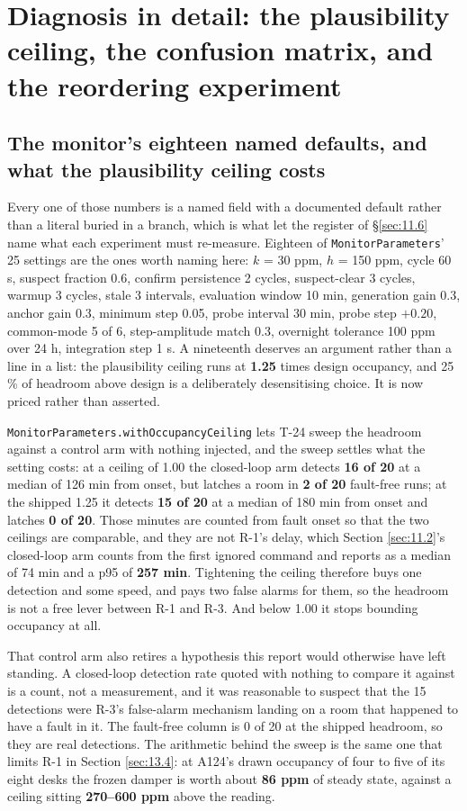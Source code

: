 \section{Diagnosis in detail: the plausibility ceiling, the confusion matrix, and the
reordering experiment}\label{sec:D}

\subsection{The monitor's eighteen named defaults, and what the plausibility ceiling costs}\label{sec:D.1}

Every one of those numbers is a named field with a documented default rather than a literal buried
in a branch, which is what let the register of §\ref{sec:11.6} name what each experiment must
re-measure. Eighteen of \texttt{MonitorParameters}' 25 settings are the ones worth naming here:
$k$ = 30 ppm, $h$ = 150 ppm, cycle 60 s, suspect fraction 0.6, confirm persistence 2 cycles,
suspect-clear 3 cycles, warmup 3 cycles, stale 3 intervals, evaluation window 10 min, generation
gain 0.3, anchor gain 0.3, minimum step 0.05, probe interval 30 min, probe step $+0.20$,
common-mode 5 of 6, step-amplitude match 0.3, overnight tolerance 100 ppm over 24 h, integration
step 1 s. A nineteenth deserves an argument rather than a line in a list: the plausibility ceiling
runs at \textbf{1.25} times design occupancy, and 25 \% of headroom above design is a deliberately
desensitising choice. It is now priced rather than asserted.

\texttt{MonitorParameters.withOccupancyCeiling} lets T-24 sweep the headroom against a control arm
with nothing injected, and the sweep settles what the setting costs: at a ceiling of 1.00 the
closed-loop arm detects \textbf{16 of 20} at a median of 126 min from onset, but latches a room in
\textbf{2 of 20} fault-free runs; at the shipped 1.25 it detects \textbf{15 of 20} at a median of
180 min from onset and latches \textbf{0 of 20}. Those minutes are counted from fault onset so
that the two ceilings are comparable, and they are not R-1's delay, which Section \ref{sec:11.2}'s
closed-loop arm counts from the first ignored command and reports as a median of 74 min and a p95
of \textbf{257 min}. Tightening the ceiling therefore buys one detection and
some speed, and pays two false alarms for them, so the headroom is not a free lever between R-1
and R-3. And below 1.00 it stops bounding occupancy at all.

That control arm also retires a hypothesis this report would otherwise have left standing. A
closed-loop detection rate quoted with nothing to compare it against is a count, not a
measurement, and it was reasonable to suspect that the 15 detections were R-3's false-alarm
mechanism landing on a room that happened to have a fault in it. The fault-free column is 0 of 20
at the shipped headroom, so they are real detections. The arithmetic behind the sweep is the same
one that limits R-1 in Section \ref{sec:13.4}: at A124's drawn occupancy of four to five of its eight desks
the frozen damper is worth about \textbf{86 ppm} of steady state, against a ceiling sitting
\textbf{270--600 ppm} above the reading.

